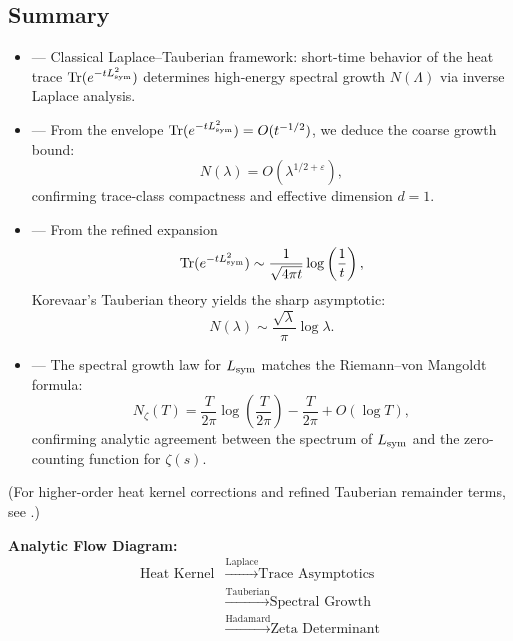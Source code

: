 \subsection*{Summary}

\begin{itemize}
  \item {} — Classical Laplace–Tauberian framework: short-time behavior of the heat trace \( \operatorname{Tr}(e^{-tL_{\mathrm{sym}}^2}) \) determines high-energy spectral growth \( N(\Lambda) \) via inverse Laplace analysis.

  \item {} — From the envelope \( \operatorname{Tr}(e^{-t L_{\mathrm{sym}}^2}) = O(t^{-1/2}) \), we deduce the coarse growth bound:
  \[
  N(\lambda) = O(\lambda^{1/2+\varepsilon}),
  \]
  confirming trace-class compactness and effective dimension \( d = 1 \).

  \item {} — From the refined expansion
  \[
  \operatorname{Tr}(e^{-t L_{\mathrm{sym}}^2}) \sim \frac{1}{\sqrt{4\pi t}} \log\left( \frac{1}{t} \right),
  \]
  Korevaar’s Tauberian theory yields the sharp asymptotic:
  \[
  N(\lambda) \sim \frac{\sqrt{\lambda}}{\pi} \log \lambda.
  \]

  \item {} — The spectral growth law for \( L_{\mathrm{sym}} \) matches the Riemann–von Mangoldt formula:
  \[
  N_\zeta(T) = \frac{T}{2\pi} \log\left( \frac{T}{2\pi} \right) - \frac{T}{2\pi} + O(\log T),
  \]
  confirming analytic agreement between the spectrum of \( L_{\mathrm{sym}} \) and the zero-counting function for \( \zeta(s) \).
\end{itemize}

\medskip
\noindent
(For higher-order heat kernel corrections and refined Tauberian remainder terms, see .)

\vspace{0.5em}

\noindent\textbf{Analytic Flow Diagram:}
\[
\begin{aligned}
\text{Heat Kernel}
&\xrightarrow{\text{Laplace}} \text{Trace Asymptotics} \\
&\xrightarrow{\text{Tauberian}} \text{Spectral Growth} \\
&\xrightarrow{\text{Hadamard}} \text{Zeta Determinant}
\end{aligned}
\]

